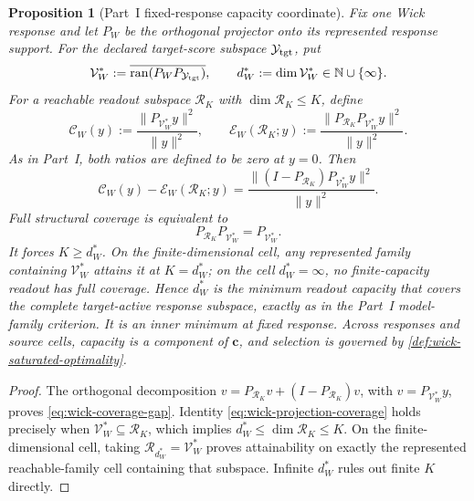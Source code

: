 \documentclass[11pt]{article}
\numberwithin{section}{part}
\theoremstyle{plain}
\newtheorem{proposition}[proposition]{Proposition}
\theoremstyle{definition}
\theoremstyle{remark}
\begin{document}
\begin{proposition}[Part~I fixed-response capacity coordinate]
\label{prop:wick-minimum-capacity-readout}
Fix one Wick response and let \(P_W\) be the orthogonal projector onto its
represented response support.  For the declared target-score subspace
\(\mathcal Y_{\rm tgt}\), put
\begin{equation}
 \label{eq:wick-intrinsic-target-subspace}
 \mathcal V_W^*:=\overline{\operatorname{ran}
 (P_WP_{\mathcal Y_{\rm tgt}})},
 \qquad d_W^*:=\dim\mathcal V_W^*\in\mathbb N\cup\{\infty\}.
\end{equation}
For a reachable readout subspace \(\mathcal R_K\) with
\(\dim\mathcal R_K\le K\), define
\[
 \mathcal C_W(y):=\frac{\|P_{\mathcal V_W^*}y\|^2}{\|y\|^2},
 \qquad
 \mathcal E_W(\mathcal R_K;y)
 :=\frac{\|P_{\mathcal R_K}P_{\mathcal V_W^*}y\|^2}{\|y\|^2}.
\]
As in Part~I, both ratios are defined to be zero at \(y=0\).
Then
\begin{equation}
 \label{eq:wick-coverage-gap}
 \mathcal C_W(y)-\mathcal E_W(\mathcal R_K;y)
 =\frac{\|(I-P_{\mathcal R_K})P_{\mathcal V_W^*}y\|^2}{\|y\|^2}.
\end{equation}
Full structural coverage is equivalent to
\begin{equation}
 \label{eq:wick-projection-coverage}
 P_{\mathcal R_K}P_{\mathcal V_W^*}=P_{\mathcal V_W^*}.
\end{equation}
It forces \(K\ge d_W^*\).  On the finite-dimensional cell, any represented
family containing \(\mathcal V_W^*\) attains it at \(K=d_W^*\); on the
cell \(d_W^*=\infty\), no finite-capacity readout has full coverage.  Hence
\(d_W^*\) is the
minimum readout capacity that covers the complete target-active response
subspace, exactly as in the Part~I model-family criterion.  It is an inner
minimum at fixed response.  Across responses and source cells, capacity is a
component of \(\mathbf c\), and selection is governed by
\cref{def:wick-saturated-optimality}.
\end{proposition}

\begin{proof}
The orthogonal decomposition
\(v=P_{\mathcal R_K}v+(I-P_{\mathcal R_K})v\), with
\(v=P_{\mathcal V_W^*}y\), proves
\eqref{eq:wick-coverage-gap}.  Identity
\eqref{eq:wick-projection-coverage} holds precisely when
\(\mathcal V_W^*\subseteq\mathcal R_K\), which implies
\(d_W^*\le\dim\mathcal R_K\le K\).  On the finite-dimensional cell, taking
\(\mathcal R_{d_W^*}=\mathcal V_W^*\) proves attainability on exactly the
represented reachable-family cell containing that subspace.  Infinite
\(d_W^*\) rules out finite \(K\) directly.
\end{proof}
\end{document}
